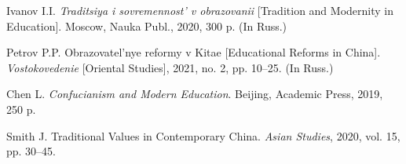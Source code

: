 \documentclass[12pt]{article}
\begin{document}
\begin{bibliolist}
\item Ivanov I.I. \textit{Traditsiya i sovremennost' v obrazovanii} [Tradition and Modernity in Education]. Moscow, Nauka Publ., 2020, 300 p. (In Russ.)
\item Petrov P.P. Obrazovatel'nye reformy v Kitae [Educational Reforms in China]. \textit{Vostokovedenie} [Oriental Studies], 2021, no. 2, pp. 10--25. (In Russ.)
\item Chen L. \textit{Confucianism and Modern Education}. Beijing, Academic Press, 2019, 250 p.
\item Smith J. Traditional Values in Contemporary China. \textit{Asian Studies}, 2020, vol. 15, pp. 30--45.
\end{bibliolist}
\end{document}
